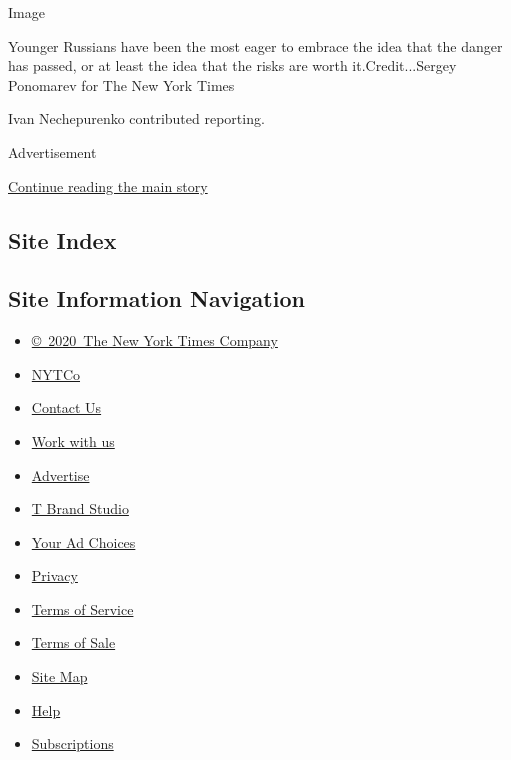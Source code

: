 Image

Younger Russians have been the most eager to embrace the idea that the
danger has passed, or at least the idea that the risks are worth
it.Credit...Sergey Ponomarev for The New York Times

Ivan Nechepurenko contributed reporting.

Advertisement

\protect\hyperlink{after-bottom}{Continue reading the main story}

\hypertarget{site-index}{%
\subsection{Site Index}\label{site-index}}

\hypertarget{site-information-navigation}{%
\subsection{Site Information
Navigation}\label{site-information-navigation}}

\begin{itemize}
\tightlist
\item
  \href{https://help.nytimes.com/hc/en-us/articles/115014792127-Copyright-notice}{©~2020~The
  New York Times Company}
\end{itemize}

\begin{itemize}
\tightlist
\item
  \href{https://www.nytco.com/}{NYTCo}
\item
  \href{https://help.nytimes.com/hc/en-us/articles/115015385887-Contact-Us}{Contact
  Us}
\item
  \href{https://www.nytco.com/careers/}{Work with us}
\item
  \href{https://nytmediakit.com/}{Advertise}
\item
  \href{http://www.tbrandstudio.com/}{T Brand Studio}
\item
  \href{https://www.nytimes.com/privacy/cookie-policy\#how-do-i-manage-trackers}{Your
  Ad Choices}
\item
  \href{https://www.nytimes.com/privacy}{Privacy}
\item
  \href{https://help.nytimes.com/hc/en-us/articles/115014893428-Terms-of-service}{Terms
  of Service}
\item
  \href{https://help.nytimes.com/hc/en-us/articles/115014893968-Terms-of-sale}{Terms
  of Sale}
\item
  \href{https://spiderbites.nytimes.com}{Site Map}
\item
  \href{https://help.nytimes.com/hc/en-us}{Help}
\item
  \href{https://www.nytimes.com/subscription?campaignId=37WXW}{Subscriptions}
\end{itemize}
